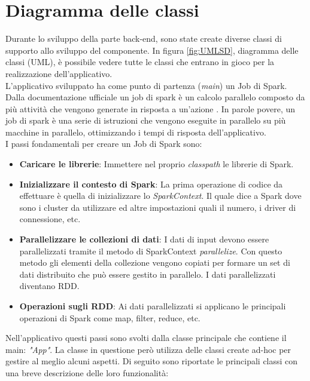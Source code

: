 \section{Diagramma delle classi}
\label{sec:diagramma delle classi}
Durante lo sviluppo della parte back-end, sono state create diverse classi di supporto allo sviluppo del componente. In figura \ref{fig:UMLSD}, diagramma delle classi (UML), è possibile vedere tutte le classi che entrano in gioco per la realizzazione dell'applicativo.
\\L'applicativo sviluppato ha come punto di partenza (\textit{main}) un Job di Spark. Dalla documentazione ufficiale un job di spark è un calcolo parallelo composto da più attività che vengono generate in risposta a un'azione \cite{spark:job}. In parole povere, un job di spark è una serie di istruzioni che vengono eseguite in parallelo su più macchine in parallelo, ottimizzando i tempi di risposta dell'applicativo. 
\\I passi fondamentali per creare un Job di Spark sono:
\begin{itemize}
\item \textbf{Caricare le librerie}: Immettere nel proprio \textit{classpath} le librerie di Spark.
\item \textbf{Inizializzare il contesto di Spark}: La prima operazione di codice da effettuare è quella di inizializzare lo \textit{SparkContext}. Il quale dice a Spark dove sono i cluster da utilizzare ed altre impostazioni quali il numero, i driver di connessione, etc.
\item \textbf{Parallelizzare le collezioni di dati}: I dati di input devono essere parallelizzati tramite il metodo di SparkContext \textit{parallelize}.
Con questo metodo gli elementi della collezione vengono copiati per formare un set di dati distribuito che può essere gestito in parallelo. I dati parallelizzati diventano RDD.
\item \textbf{Operazioni sugli RDD}: Ai dati parallelizzati si applicano le principali operazioni di Spark come map, filter, reduce, etc.
\end{itemize}
Nell'applicativo questi passi sono svolti dalla classe principale che contiene il main: \textit{"App"}. La classe in questione però utilizza delle classi create ad-hoc per gestire al meglio alcuni aspetti. Di seguito sono riportate le principali classi con una breve descrizione delle loro funzionalità: 

